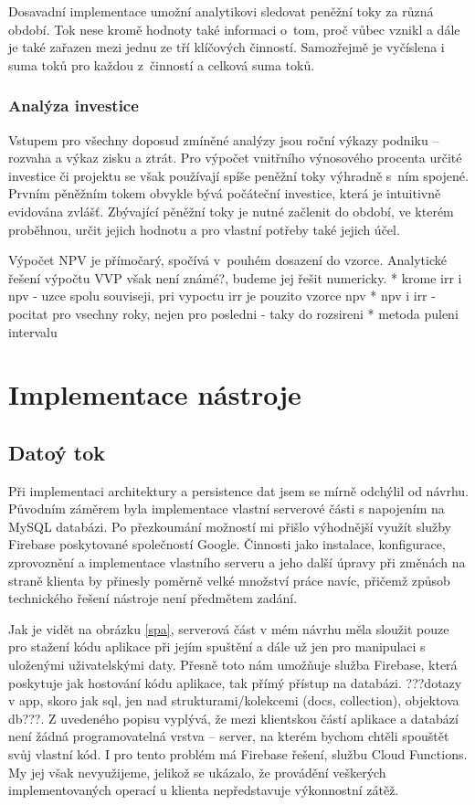 Dosavadní implementace umožní analytikovi sledovat peněžní toky za různá období. Tok nese kromě hodnoty také informaci o~tom, proč vůbec vznikl a dále je také zařazen mezi jednu ze tří klíčových činností. Samozřejmě je vyčíslena i suma toků pro každou z~činností a celková suma toků.

\subsubsection{Analýza investice}
\label{irr}
Vstupem pro všechny doposud zmíněné analýzy jsou roční výkazy podniku -- rozvaha a výkaz zisku a ztrát. Pro výpočet vnitřního výnosového procenta určité investice či projektu se však používají spíše peněžní toky výhradně s~ním spojené. Prvním pěněžním tokem obvykle bývá počáteční investice, která je intuitivně evidována zvlášť. Zbývající pěněžní toky je nutné začlenit do období, ve kterém proběhnou, určit jejich hodnotu a pro vlastní potřeby také jejich účel.

Výpočet NPV je přímočarý, spočívá v~pouhém dosazení do vzorce. Analytické řešení výpočtu VVP však není známé?, budeme jej řešit numericky. 
* krome irr i npv - uzce spolu souviseji, pri vypoctu irr je pouzito vzorce npv
* npv i irr - pocitat pro vsechny roky, nejen pro posledni - taky do rozsireni
* metoda puleni intervalu



\section{Implementace nástroje}

\subsection{Datoý tok}
Při implementaci architektury a persistence dat jsem se mírně odchýlil od návrhu. Původním záměrem byla implementace vlastní serverové části s napojením na MySQL databázi. Po přezkoumání možností mi přišlo výhodnější využít služby Firebase poskytované společností Google. Činnosti jako instalace, konfigurace, zprovoznění a implementace vlastního serveru a jeho další úpravy při změnách na straně klienta by přinesly poměrně velké množství práce navíc, přičemž způsob technického řešení nástroje není předmětem zadání.

Jak je vidět na obrázku \ref{spa}, serverová část v mém návrhu měla sloužit pouze pro stažení kódu aplikace při jejím spuštění a dále už jen pro manipulaci s uloženými uživatelskými daty. Přesně toto nám umožňuje služba Firebase, která poskytuje jak hostování kódu aplikace, tak přímý přístup na databázi. ???dotazy v app, skoro jak sql, jen nad strukturami/kolekcemi (docs, collection), objektova db???. Z uvedeného popisu vyplývá, že mezi klientskou částí aplikace a databází není žádná programovatelná vrstva -- server, na kterém bychom chtěli spouštět svůj vlastní kód. I pro tento problém má Firebase řešení, službu Cloud Functions. My jej však nevyužijeme, jelikož se ukázalo, že provádění veškerých implementovaných operací u klienta nepředstavuje výkonnostní zátěž.

